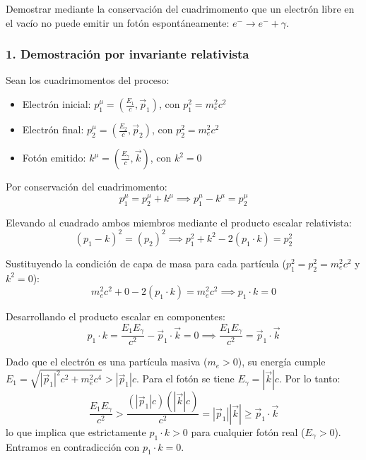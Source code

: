 \newpage
\begin{problema}
Demostrar mediante la conservación del cuadrimomento que un electrón libre en el vacío no puede emitir un fotón espontáneamente: $e^- \rightarrow e^- + \gamma$.

\tcblower

\subsubsection*{1. Demostración por invariante relativista}

Sean los cuadrimomentos del proceso:
\begin{itemize}
    \item Electrón inicial: $p_1^\mu = \left(\frac{E_1}{c}, \vec{p}_1\right)$, con $p_1^2 = m_e^2 c^2$
    \item Electrón final: $p_2^\mu = \left(\frac{E_2}{c}, \vec{p}_2\right)$, con $p_2^2 = m_e^2 c^2$
    \item Fotón emitido: $k^\mu = \left(\frac{E_\gamma}{c}, \vec{k}\right)$, con $k^2 = 0$
\end{itemize}

Por conservación del cuadrimomento:
\[
p_1^\mu = p_2^\mu + k^\mu \implies p_1^\mu - k^\mu = p_2^\mu
\]

Elevando al cuadrado ambos miembros mediante el producto escalar relativista:
\[
(p_1 - k)^2 = (p_2)^2 \implies p_1^2 + k^2 - 2 (p_1 \cdot k) = p_2^2
\]

Sustituyendo la condición de capa de masa para cada partícula ($p_1^2 = p_2^2 = m_e^2 c^2$ y $k^2 = 0$):
\[
m_e^2 c^2 + 0 - 2 (p_1 \cdot k) = m_e^2 c^2 \implies p_1 \cdot k = 0
\]

Desarrollando el producto escalar en componentes:
\[
p_1 \cdot k = \frac{E_1 E_\gamma}{c^2} - \vec{p}_1 \cdot \vec{k} = 0 \implies \frac{E_1 E_\gamma}{c^2} = \vec{p}_1 \cdot \vec{k}
\]

Dado que el electrón es una partícula masiva ($m_e > 0$), su energía cumple $E_1 = \sqrt{|\vec{p}_1|^2 c^2 + m_e^2 c^4} > |\vec{p}_1| c$. Para el fotón se tiene $E_\gamma = |\vec{k}| c$. Por lo tanto:
\[
\frac{E_1 E_\gamma}{c^2} > \frac{(|\vec{p}_1| c)(|\vec{k}| c)}{c^2} = |\vec{p}_1| |\vec{k}| \ge \vec{p}_1 \cdot \vec{k}
\]
lo que implica que estrictamente $p_1 \cdot k > 0$ para cualquier fotón real ($E_\gamma > 0$). Entramos en contradicción con $p_1 \cdot k = 0$.


\end{problema}
